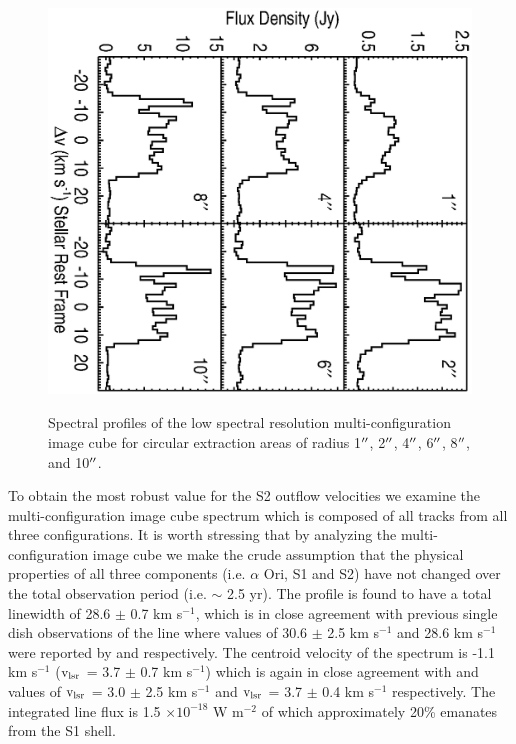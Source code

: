 \documentclass[iop]{emulateapj}
\begin{document}
\begin{figure}
\includegraphics[scale=0.75, angle=90, width=13.0cm, height=11cm, trim=20pt 50pt 20pt 40pt]{f2.eps}
\caption{Spectral profiles of the low spectral resolution multi-configuration image cube for circular extraction areas of radius 1$\mbox{$^{\prime\prime}$}$, 2$\mbox{$^{\prime\prime}$}$, 4$\mbox{$^{\prime\prime}$}$, 6$\mbox{$^{\prime\prime}$}$, 8$\mbox{$^{\prime\prime}$}$, and 10$\mbox{$^{\prime\prime}$}$.}
\label{fig:fig2}
\end{figure}

To obtain the most robust value for the S2 outflow velocities we examine the multi-configuration image cube spectrum which is composed of all tracks from all three configurations. It is worth stressing that by analyzing the multi-configuration image cube we make the crude assumption that the physical properties of all three components (i.e. $\alpha$ Ori, S1 and S2) have not changed over the total observation period (i.e. $\sim$ 2.5 yr). The profile is found to have a total linewidth of 28.6 $\pm$ 0.7 km s${}^{-1}$, which is in close agreement with previous single dish observations of the line where values of 30.6 $\pm$ 2.5 km s${}^{-1}$ and 28.6 km s${}^{-1}$ were reported by \cite{1980ApJ...242L..25K} and \cite{1987ApJ...313..400H} respectively. The centroid velocity of the spectrum is  -1.1 km s${}^{-1}$ ($\rm{v_{lsr}}$ = 3.7 $\pm$ 0.7 km s${}^{-1}$) which is again in close agreement with \cite{1980ApJ...242L..25K} and \cite{1987ApJ...313..400H} values of $\rm{v_{lsr}}$ = 3.0 $\pm$ 2.5 km s${}^{-1}$ and $\rm{v_{lsr}}$ = 3.7 $\pm$ 0.4 km s${}^{-1}$ respectively. The integrated line flux is 1.5 $\times 10^{-18}$ W m$^{-2}$ of which approximately 20\% emanates from the S1 shell.
\end{document}

